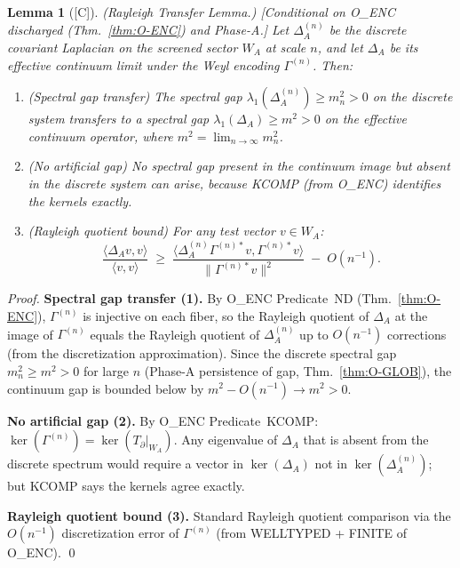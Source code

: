 \documentclass[12pt,oneside]{amsbook}
\theoremstyle{plain}
\newtheorem{lemma}[theorem]{Lemma}
\theoremstyle{definition}
\theoremstyle{remark}
\newcommand{\status}[1]{\textup{[#1]}}
\begin{document}
\begin{lemma}[\status{C}]\label{lem:rayleigh-transfer}
\textup{(Rayleigh Transfer Lemma.)}
\textup{[Conditional on O\_ENC discharged
(Thm.~\ref{thm:O-ENC}) and Phase-A.]}
Let $\Delta_A^{(n)}$ be the discrete covariant Laplacian on the
screened sector $W_A$ at scale $n$, and let $\Delta_A$ be its
effective continuum limit under the Weyl encoding
$\Gamma^{(n)}$. Then:
\begin{enumerate}[label=\textup{(\arabic*)}]
 \item (\emph{Spectral gap transfer}) The spectral gap
 $\lambda_1(\Delta_A^{(n)}) \geq m_n^2 > 0$ on the discrete
 system transfers to a spectral gap
 $\lambda_1(\Delta_A) \geq m^2 > 0$ on the effective continuum
 operator, where $m^2 = \lim_{n\to\infty} m_n^2$.
 \item (\emph{No artificial gap}) No spectral gap present in the
 continuum image but absent in the discrete system can arise,
 because KCOMP (from O\_ENC) identifies the kernels exactly.
 \item (\emph{Rayleigh quotient bound}) For any test vector
 $v \in W_A$:
 \[
 \frac{\langle \Delta_A v, v\rangle}{\langle v,v\rangle}
 \;\geq\;
 \frac{\langle \Delta_A^{(n)} \Gamma^{(n)*}v,
 \Gamma^{(n)*}v\rangle}
 {\|\Gamma^{(n)*}v\|^2}
 \;-\; O(n^{-1}).
 \]
\end{enumerate}
\end{lemma}

\begin{proof}
\textbf{Spectral gap transfer (1).}
By O\_ENC Predicate~ND (Thm.~\ref{thm:O-ENC}), $\Gamma^{(n)}$
is injective on each fiber, so the Rayleigh quotient of $\Delta_A$
at the image of $\Gamma^{(n)}$ equals the Rayleigh quotient of
$\Delta_A^{(n)}$ up to $O(n^{-1})$ corrections (from the
discretization approximation). Since the discrete spectral gap
$m_n^2 \geq m^2 > 0$ for large $n$ (Phase-A persistence of gap,
Thm.~\ref{thm:O-GLOB}), the continuum gap is bounded below by
$m^2 - O(n^{-1}) \to m^2 > 0$.

\textbf{No artificial gap (2).}
By O\_ENC Predicate~KCOMP: $\ker(\Gamma^{(n)}) =
\ker(T_\partial|_{W_A})$.  Any eigenvalue of $\Delta_A$ that is
absent from the discrete spectrum would require a vector in
$\ker(\Delta_A)$ not in $\ker(\Delta_A^{(n)})$; but KCOMP says
the kernels agree exactly.

\textbf{Rayleigh quotient bound (3).}
Standard Rayleigh quotient comparison via the $O(n^{-1})$
discretization error of $\Gamma^{(n)}$ (from WELLTYPED + FINITE
of O\_ENC). \qed
\end{proof}
\end{document}
